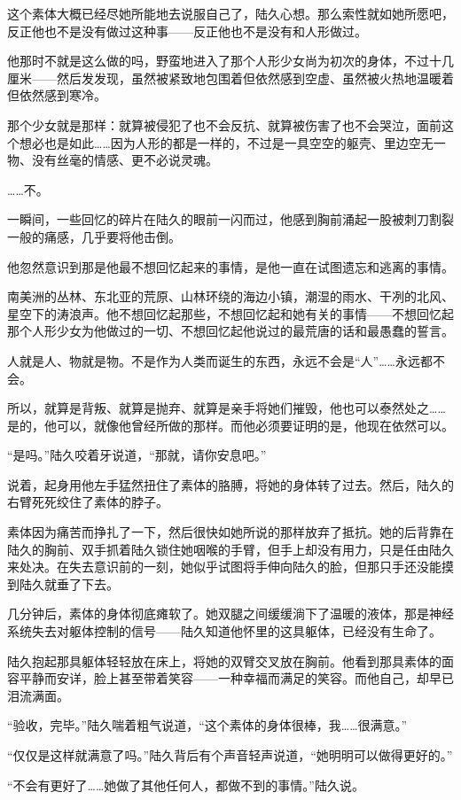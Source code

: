 这个素体大概已经尽她所能地去说服自己了，陆久心想。那么索性就如她所愿吧，反正他也不是没有做过这种事——反正他也不是没有和人形做过。

他那时不就是这么做的吗，野蛮地进入了那个人形少女尚为初次的身体，不过十几厘米——然后发发现，虽然被紧致地包围着但依然感到空虚、虽然被火热地温暖着但依然感到寒冷。

那个少女就是那样：就算被侵犯了也不会反抗、就算被伤害了也不会哭泣，面前这个想必也是如此……因为人形的都是一样的，不过是一具空空的躯壳、里边空无一物、没有丝毫的情感、更不必说灵魂。

……不。

一瞬间，一些回忆的碎片在陆久的眼前一闪而过，他感到胸前涌起一股被刺刀割裂一般的痛感，几乎要将他击倒。

他忽然意识到那是他最不想回忆起来的事情，是他一直在试图遗忘和逃离的事情。

南美洲的丛林、东北亚的荒原、山林环绕的海边小镇，潮湿的雨水、干冽的北风、星空下的涛浪声。他不想回忆起那些，不想回忆起和她有关的事情——不想回忆起那个人形少女为他做过的一切、不想回忆起他说过的最荒唐的话和最愚蠢的誓言。

人就是人、物就是物。不是作为人类而诞生的东西，永远不会是“人”……永远都不会。

所以，就算是背叛、就算是抛弃、就算是亲手将她们摧毁，他也可以泰然处之……是的，他可以，就像他曾经所做的那样。而他必须要证明的是，他现在依然可以。

“是吗。”陆久咬着牙说道，“那就，请你安息吧。”

说着，起身用他左手猛然扭住了素体的胳膊，将她的身体转了过去。然后，陆久的右臂死死绞住了素体的脖子。

素体因为痛苦而挣扎了一下，然后很快如她所说的那样放弃了抵抗。她的后背靠在陆久的胸前、双手抓着陆久锁住她咽喉的手臂，但手上却没有用力，只是任由陆久来处决。在失去意识前的一刻，她似乎试图将手伸向陆久的脸，但那只手还没能摸到陆久就垂了下去。

几分钟后，素体的身体彻底瘫软了。她双腿之间缓缓淌下了温暖的液体，那是神经系统失去对躯体控制的信号——陆久知道他怀里的这具躯体，已经没有生命了。

陆久抱起那具躯体轻轻放在床上，将她的双臂交叉放在胸前。他看到那具素体的面容平静而安详，脸上甚至带着笑容——一种幸福而满足的笑容。而他自己，却早已泪流满面。

“验收，完毕。”陆久喘着粗气说道，“这个素体的身体很棒，我……很满意。”

“仅仅是这样就满意了吗。”陆久背后有个声音轻声说道，“她明明可以做得更好的。”

“不会有更好了……她做了其他任何人，都做不到的事情。”陆久说。

